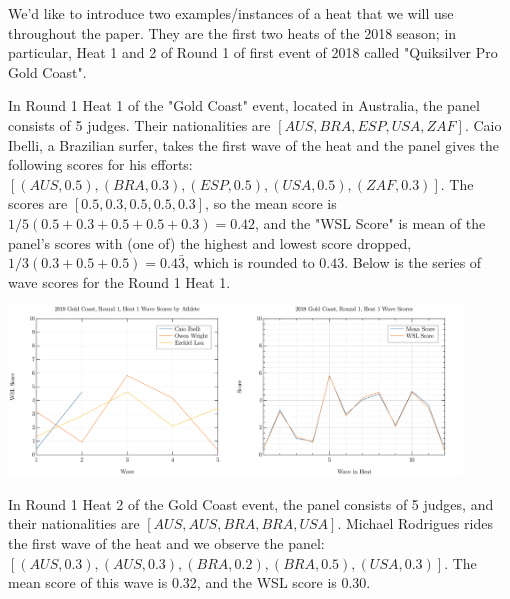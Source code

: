 \documentclass{article}
\theoremstyle{definition}
\begin{document}
We'd like to introduce two examples/instances of a heat that we will use throughout the paper. They are the first two heats of the 2018 season; in particular, Heat 1 and 2 of Round 1 of first event of 2018 called "Quiksilver Pro Gold Coast".

In Round 1 Heat 1 of the "Gold Coast" event, located in Australia, the panel consists of 5 judges. Their nationalities are $[AUS,BRA,ESP, USA,ZAF]$. Caio Ibelli, a Brazilian surfer, takes the first wave of the heat and the panel gives the following scores for his efforts: $ [(AUS,0.5), (BRA,0.3),(ESP,0.5),(USA,0.5),(ZAF,0.3)]$. The scores are $[0.5,0.3,0.5,0.5,0.3]$, so the mean score is $1/5(0.5+0.3+0.5+0.5+0.3) = 0.42$, and the "WSL Score" is mean of the panel's scores with (one of) the highest and lowest score dropped, $1/3(0.3+0.5+0.5) = 0.4\bar{3}$, which is rounded to $0.43$. Below is the series of wave scores for the Round 1 Heat 1.

\includegraphics[width=6cm]{./src/visuals/2018GCR1/WaveScoresByAthH1.png}\includegraphics[width=6cm]{./src/visuals/2018GCR1/WaveScoresH1.png}

In Round 1 Heat 2 of the Gold Coast event, the panel consists of 5 judges, and their nationalities are $[AUS,AUS,BRA,BRA,USA]$. Michael Rodrigues rides the first wave of the heat and we observe the panel: $[(AUS,0.3),(AUS,0.3),(BRA,0.2),(BRA,0.5),(USA,0.3)]$. The mean score of this wave is 0.32, and the WSL score is 0.30.
\end{document}
